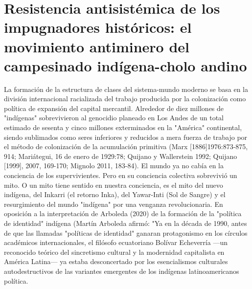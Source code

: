 \documentclass[]{interact}
\theoremstyle{plain}%
\theoremstyle{definition}
\theoremstyle{remark}
\begin{document}
\section{Resistencia antisistémica de los impugnadores históricos: el movimiento antiminero del campesinado indígena-cholo andino}

La formación de la estructura de clases del sistema-mundo moderno se basa en la división internacional racializada del trabajo producida por la colonización como política de expansión del capital mercantil. Alrededor de diez millones de "indígenas" sobrevivieron al genocidio planeado en Los Andes de un total estimado de sesenta y cinco millones exterminados en la "América" continental, siendo sublimados como seres inferiores y reducidos a mera fuerza de trabajo por el método de colonización de la acumulación primitiva (Marx [1886]1976:873-875, 914; Mariátegui, 16 de enero de 1929:78; Quijano y Wallerstein 1992; Quijano [1999], 2007, 169-170; Mignolo 2011, 183-84). El mundo ya no cabía en la conciencia de los supervivientes. Pero en su conciencia colectiva sobrevivió un mito. O un mito tiene sentido en nuestra conciencia, es el mito del nuevo indígena, del Inkarri (el retorno Inka), del Yawar-Inti (Sol de Sangre) y el resurgimiento del mundo "indígena" por una venganza revolucionaria. En oposición a la interpretación de Arboleda (2020) de la formación de la "política de identidad" indígena (Martín Arboleda afirmó: "Ya en la década de 1990, antes de que las llamadas "políticas de identidad" ganaran protagonismo en los círculos académicos internacionales, el filósofo ecuatoriano Bolívar Echeverría —un reconocido teórico del sincretismo cultural y la modernidad capitalista en América Latina— ya estaba desconcertado por los esencialismos culturales autodestructivos de las variantes emergentes de los indígenas latinoamericanos política. 
\end{document}
